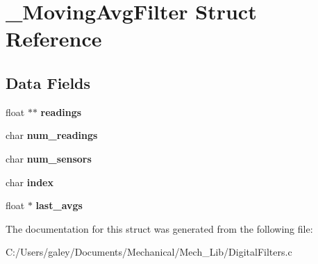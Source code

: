 \hypertarget{struct___moving_avg_filter}{}\section{\+\_\+\+Moving\+Avg\+Filter Struct Reference}
\label{struct___moving_avg_filter}
\subsection*{Data Fields}
\begin{DoxyCompactItemize}
\item 
\mbox{\label{struct___moving_avg_filter_a2b01535ec66300faea421eb5f3b022a2}} 
float $\ast$$\ast$ {\bfseries readings}
\item 
\mbox{\label{struct___moving_avg_filter_abc2e33e111e271287c2e16baca7cbd72}} 
char {\bfseries num\+\_\+readings}
\item 
\mbox{\label{struct___moving_avg_filter_a61ffa5e8419f704d3e06b31b78a4546d}} 
char {\bfseries num\+\_\+sensors}
\item 
\mbox{\label{struct___moving_avg_filter_a8f564a8b3781dfabef60c05915da85f8}} 
char {\bfseries index}
\item 
\mbox{\label{struct___moving_avg_filter_a0a3a484dee9a5fa0bbb061961717adbc}} 
float $\ast$ {\bfseries last\+\_\+avgs}
\end{DoxyCompactItemize}


The documentation for this struct was generated from the following file\+:\begin{DoxyCompactItemize}
\item 
C\+:/\+Users/galey/\+Documents/\+Mechanical/\+Mech\+\_\+\+Lib/Digital\+Filters.\+c\end{DoxyCompactItemize}

